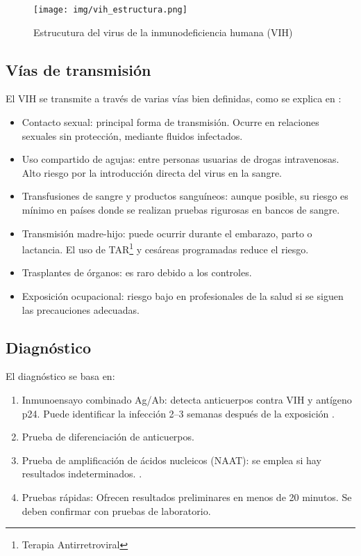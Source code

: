\begin{enumerate}
\begin{figure}[H]
    \centering
    \texttt{[image: img/vih\_estructura.png]}
    \caption{Estrucutura del virus de la inmunodeficiencia humana (VIH)}
    \label{fig:vih estructura}
    \vspace{0.5cm} %
\end{figure}

\subsection{Vías de transmisión}
El VIH se transmite a través de varias vías bien definidas, como se explica en \cite{shaw2012hiv}:
\begin{itemize}
    \item Contacto sexual: principal forma de transmisión. Ocurre en relaciones sexuales sin protección, mediante fluidos infectados.
    \item Uso compartido de agujas: entre personas usuarias de drogas intravenosas. Alto riesgo por la introducción directa del virus en la sangre.
    \item Transfusiones de sangre y productos sanguíneos: aunque posible, su riesgo es mínimo en países donde se realizan pruebas rigurosas en bancos de sangre.
    \item Transmisión madre-hijo: puede ocurrir durante el embarazo, parto o lactancia. El uso de TAR\footnote{Terapia Antirretroviral} y cesáreas programadas reduce el riesgo.
    \item Trasplantes de órganos: es raro debido a los controles.
    \item Exposición ocupacional: riesgo bajo en profesionales de la salud si se siguen las precauciones adecuadas.
\end{itemize}

\subsection{Diagnóstico}
El diagnóstico se basa en:
\begin{enumerate}
    \item Inmunoensayo combinado Ag/Ab: detecta anticuerpos contra VIH y antígeno p24. Puede identificar la infección 2–3 semanas después de la exposición \cite{workowski2021sexually}.
    \item Prueba de diferenciación de anticuerpos.
    \item Prueba de amplificación de ácidos nucleicos (NAAT): se emplea si hay resultados indeterminados. \cite{saag2021hiv}.
    \item Pruebas rápidas: Ofrecen resultados preliminares en menos de 20 minutos. Se deben confirmar con pruebas de laboratorio.
\end{enumerate}


\end{enumerate}
